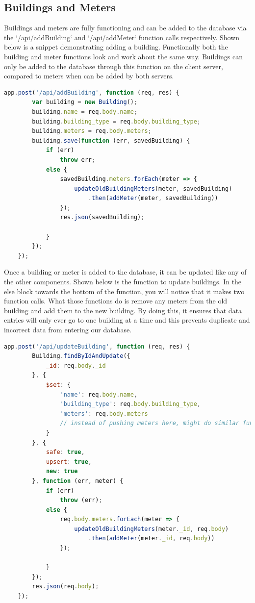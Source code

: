 \documentclass[letterpaper,10pt,serif,draftclsnofoot,onecolumn,compsoc,titlepage]{IEEEtran}
\begin{document}
\subsection{Buildings and Meters}
Buildings and meters are fully functioning and can be added to the database via the `/api/addBuilding` and `/api/addMeter` function calls respectively. Shown below is a snippet demonstrating adding a building. Functionally both the building and meter functions look and work about the same way. Buildings can only be added to the database through this function on the client server, compared to meters when can be added by both servers.
\begin{lstlisting}[language=JavaScript]
 app.post('/api/addBuilding', function (req, res) {
        var building = new Building();
        building.name = req.body.name;
        building.building_type = req.body.building_type;
        building.meters = req.body.meters;
        building.save(function (err, savedBuilding) {
            if (err)
                throw err;
            else {
                savedBuilding.meters.forEach(meter => {
                    updateOldBuildingMeters(meter, savedBuilding)
                        .then(addMeter(meter, savedBuilding))
                });
                res.json(savedBuilding);

            }
        });
    });
\end{lstlisting}
\noindent Once a building or meter is added to the database, it can be updated like any of the other components. Shown below is the function to update buildings. In the else block towards the bottom of the function, you will notice that it makes two function calls. What those functions do is remove any meters from the old building and add them to the new building. By doing this, it ensures that data entries will only ever go to one building at a time and this prevents duplicate and incorrect data from entering our database. \\
\begin{lstlisting}[language=JavaScript]
 app.post('/api/updateBuilding', function (req, res) {
        Building.findByIdAndUpdate({
            _id: req.body._id
        }, {
            $set: {
                'name': req.body.name,
                'building_type': req.body.building_type,
                'meters': req.body.meters
                // instead of pushing meters here, might do similar function call like in addBuilding
            }
        }, {
            safe: true,
            upsert: true,
            new: true
        }, function (err, meter) {
            if (err)
                throw (err);
            else {
                req.body.meters.forEach(meter => {
                    updateOldBuildingMeters(meter._id, req.body)
                        .then(addMeter(meter._id, req.body))
                });

            }
        });
        res.json(req.body);
    });
\end{lstlisting}
\end{document}
